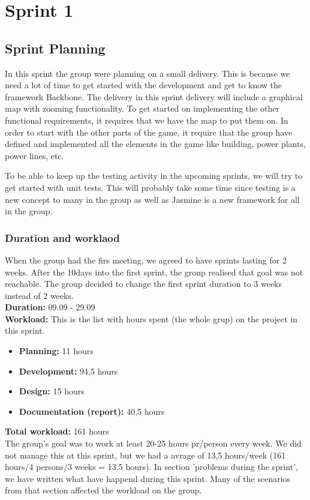 \section{Sprint 1}
\subsection{Sprint Planning}
	In this sprint the group were planning on a small delivery. This is because we need a lot of time to get started with the development and get to know the framework Backbone. The delivery in this sprint delivery will include a graphical map with zooming functionality. To get started on implementing the other functional requirements, it requires that we have the map to put them on. 
	In order to start with the other parts of the game, it require that the group have defined and implemented all the elements in the game like building, power plants, power lines, etc.

	To be able to keep up the testing activity in the upcoming sprints, we will try to get started with unit tests. This will probably take some time since testing is a new concept to many in the group as well as Jasmine is a new framework for all in the group. 

\subsubsection{Duration and worklaod}
	When the group had the firs meeting, we agreed to have sprints lasting for 2 weeks.
	After the 10days into the first sprint, the group realised that goal was not reachable.
	The group decided to change the first sprint duration to 3 weeks instead of 2 weeks. \\
	{\bf Duration:} 09.09 - 29.09 \\
	{\bf Workload:} This is the list with hours spent (the whole grup) on the project in this sprint.
	\begin{itemize}
		\item {\bf Planning:} 11 hours
		\item {\bf Development:} 94,5 hours
		\item {\bf Design:} 15 hours
		\item {\bf Documentation (report):} 40,5 hours
	\end{itemize}
	{\bf Total workload: } 161 hours \\
	The group's goal was to work at least 20-25 hours pr/person every week. We did not manage this at this sprint, but we had a avrage of 13,5 hours/week (161 hours/4 persons/3 weeks = 13.5 hours). 
	In section 'problems during the sprint', we have written what have happend during this sprint.
	Many of the scenarios from that section affected the workload on the group. 

